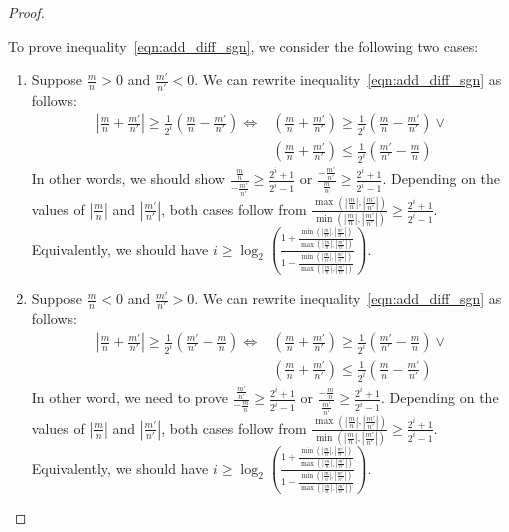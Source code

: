 \documentclass{article}
\numberwithin{mytheorem}{section}
\begin{document}
\begin{proof}
\begin{enumerate}[i.]
To prove inequality~\eqref{eqn:add_diff_sgn}, we consider the following two cases:
\begin{enumerate}[1.]
\item
Suppose $\frac{m}{n}>0$ and $\frac{m'}{n'}<0$. We can rewrite inequality~\eqref{eqn:add_diff_sgn} as follows:
\begin{align*}
|\frac{m}{n}+\frac{m'}{n'}| \geq \frac{1}{2^i}(\frac{m}{n}-\frac{m'}{n'}) \Leftrightarrow & (\frac{m}{n}+\frac{m'}{n'})\geq \frac{1}{2^i}(\frac{m}{n}-\frac{m'}{n'}) \vee \\
&(\frac{m}{n}+\frac{m'}{n'})\leq \frac{1}{2^i}(\frac{m'}{n'}-\frac{m}{n}) 
\end{align*} 
In other words, we should show $\frac{\frac{m}{n}}{-\frac{m'}{n'}}\geq \frac{2^i+1}{2^i-1}$ or $\frac{-\frac{m'}{n'}}{\frac{m}{n}}\geq \frac{2^i+1}{2^i-1}$. Depending on the values of $|\frac{m}{n}|$ and $|\frac{m'}{n'}|$, both cases follow from $\frac{\max(|\frac{m}{n}|,|\frac{m'}{n'}|)}{\min(|\frac{m}{n}|,|\frac{m'}{n'}|)}\geq \frac{2^i+1}{2^i-1}$. Equivalently, we should have $i\geq \log_2(\frac{1+\frac{\min(|\frac{m}{n}|,|\frac{m'}{n'}|)}{\max(|\frac{m}{n}|,|\frac{m'}{n'}|)}}{1-\frac{\min(|\frac{m}{n}|,|\frac{m'}{n'}|)}{\max(|\frac{m}{n}|,|\frac{m'}{n'}|)}})$.
\item
Suppose $\frac{m}{n}<0$ and $\frac{m'}{n'}>0$. We can rewrite inequality~\eqref{eqn:add_diff_sgn} as follows:
\begin{align*}
|\frac{m}{n}+\frac{m'}{n'}|\geq \frac{1}{2^i}(\frac{m'}{n'}-\frac{m}{n}) \Leftrightarrow & (\frac{m}{n}+\frac{m'}{n'})\geq \frac{1}{2^i}(\frac{m'}{n'}-\frac{m}{n}) \vee \\
& (\frac{m}{n}+\frac{m'}{n'}) \leq \frac{1}{2^i}(\frac{m}{n}-\frac{m'}{n'})
\end{align*}
In other word, we need to prove $\frac{\frac{m'}{n'}}{-\frac{m}{n}}\geq \frac{2^i+1}{2^i-1}$ or $\frac{-\frac{m}{n}}{\frac{m'}{n'}}\geq \frac{2^i+1}{2^i-1}$. Depending on the values of $|\frac{m}{n}|$ and $|\frac{m'}{n'}|$, both cases follow from $\frac{\max(|\frac{m}{n}|,|\frac{m'}{n'}|)}{\min(|\frac{m}{n}|,|\frac{m'}{n'}|)}\geq \frac{2^i+1}{2^i-1}$. Equivalently, we should have $i\geq \log_2(\frac{1+\frac{\min(|\frac{m}{n}|,|\frac{m'}{n'}|)}{\max(|\frac{m}{n}|,|\frac{m'}{n'}|)}}{1-\frac{\min(|\frac{m}{n}|,|\frac{m'}{n'}|)}{\max(|\frac{m}{n}|,|\frac{m'}{n'}|)}})$.
\end{enumerate}
\end{enumerate}

\end{proof}
\end{document}
